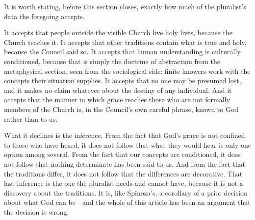 It is worth stating, before this section closes, exactly how much of the pluralist's data the foregoing accepts.

It accepts that people outside the visible Church live holy lives, because the Church teaches it. It accepts that other traditions contain what is true and holy, because the Council said so. It accepts that human understanding is culturally conditioned, because that is simply the doctrine of abstraction from the metaphysical section, seen from the sociological side: finite knowers work with the concepts their situation supplies. It accepts that no one may be presumed lost, and it makes no claim whatever about the destiny of any individual. And it accepts that the manner in which grace reaches those who are not formally members of the Church is, in the Council's own careful phrase, known to God rather than to us.

What it declines is the inference. From the fact that God's grace is not confined to those who have heard, it does not follow that what they would hear is only one option among several. From the fact that our concepts are conditioned, it does not follow that nothing determinate has been said to us. And from the fact that the traditions differ, it does not follow that the differences are decorative. That last inference is the one the pluralist needs and cannot have, because it is not a discovery about the traditions. It is, like Spinoza's, a corollary of a prior decision about what God can be---and the whole of this article has been an argument that the decision is wrong.

